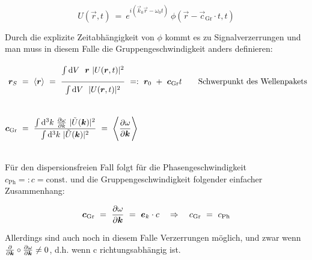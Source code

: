 \begin{equation*}
U(\vec{r},t) \ = \  e^{i(\vec{k}_0\vec{r}-\omega_0 t)} \ \phi(\vec{r} - \vec{c}_{\text{Gr}} \cdot t,t)
\end{equation*}

Durch die explizite Zeitabhängigkeit von $\phi$ kommt es zu Signalverzerrungen und man muss in diesem Falle die Gruppengeschwindigkeit anders definieren:

\begin{align*}
\vec{r}_S \ &= \ \langle\vec{r}\rangle \ = \ \frac{\Int{}{}{V} \ \vec{r} \ |U(\vec{r},t)|^2}{\Int{}{}{V} \ |U(\vec{r},t)|^2} \ =: \  \vec{r}_0 \ + \ \vec{c}_{\text{Gr}} t \qquad \text{Schwerpunkt des Wellenpakets}\\
\ \\
\vec{c}_{\text{Gr}}  \ &= \ \frac{\int\d^3 k \ \pdiff{\omega}{k} \ |\tilde{U}(\vec{k})|^2}{\int\d^3 k \ |\tilde{U}(\vec{k})|^2} \ = \ \Bigg\langle\pdiff{\omega}{\vec{k}}\Bigg\rangle
\end{align*}

\ \\
Für den dispersionsfreien Fall folgt für die Phasengeschwindigkeit $c_{\text{Ph}} =: c = \text{const.}$ und die Gruppengeschwindigkeit folgender einfacher Zusammenhang:

\begin{equation*}
\vec{c}_{\text{Gr}} \ = \ \pdiff{\omega}{\vec{k}} \ = \ \vec{e}_k\cdot c \quad\Rightarrow\quad c_{\text{Gr}} \ = \ c_{\text{Ph}}
\end{equation*}

Allerdings sind auch noch in diesem Falle Verzerrungen möglich, und zwar wenn $\frac{\partial{}}{\partial{\bm{k}}}\circ\frac{\partial{\omega}}{\partial{\bm{k}}}\neq 0$, d.h. wenn c richtungsabhängig ist.